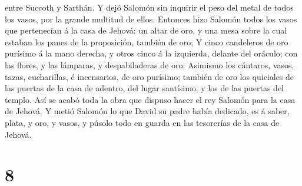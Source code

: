 entre Succoth y Sarthán.  Y dejó Salomón sin inquirir el
peso del metal de todos los vasos, por la grande multitud de ellos.
 Entonces hizo Salomón todos los vasos que pertenecían á la
casa de Jehová: un altar de oro, y una mesa sobre la cual estaban los
panes de la proposición, también de oro;  Y cinco
candeleros de oro purísimo á la mano derecha, y otros cinco á la
izquierda, delante del oráculo; con las flores, y las lámparas, y
despabiladeras de oro;  Asimismo los cántaros, vasos,
tazas, cucharillas, é incensarios, de oro purísimo; también de oro los
quiciales de las puertas de la casa de adentro, del lugar santísimo, y
los de las puertas del templo.  Así se acabó toda la obra
que dispuso hacer el rey Salomón para la casa de Jehová. Y metió Salomón
lo que David su padre había dedicado, es á saber, plata, y oro, y vasos,
y púsolo todo en guarda en las tesorerías de la casa de Jehová.

\hypertarget{section-7}{%
\section{8}\label{section-7}}

